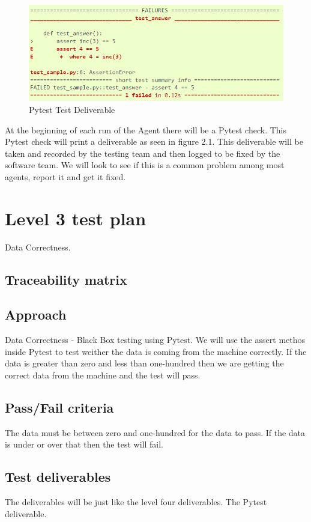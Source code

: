 \documentclass[letterpaper,12pt,oneside,listof=totoc]{scrreprt}
\begin{document}
\begin{figure}
\includegraphics[width=15cm]{deliverable.png}
  \caption{\label{fig:module} Pytest Test Deliverable }
\end{figure}
At the beginning of each run of the Agent there will be a Pytest check. This Pytest check will print a deliverable as seen in figure 2.1. This deliverable will be taken and recorded by the testing team and then logged to be fixed by the software team. We will look to see if this is a common problem among most agents, report it and get it fixed.

\section{Level 3 test plan}
Data Correctness.
\subsection{Traceability matrix}

\subsection{Approach}
Data Correctness - Black Box testing using Pytest. We will use the assert methos inside Pytest to test weither the data is coming from the machine correctly. If the data is greater than zero and less than one-hundred then we are getting the correct data from the machine and the test will pass.
\subsection{Pass/Fail criteria}
The data must be between zero and one-hundred for the data to pass. If the data is under or over that then the test will fail.
\subsection{Test deliverables}
The deliverables will be just like the level four deliverables. The Pytest deliverable.
\end{document}
